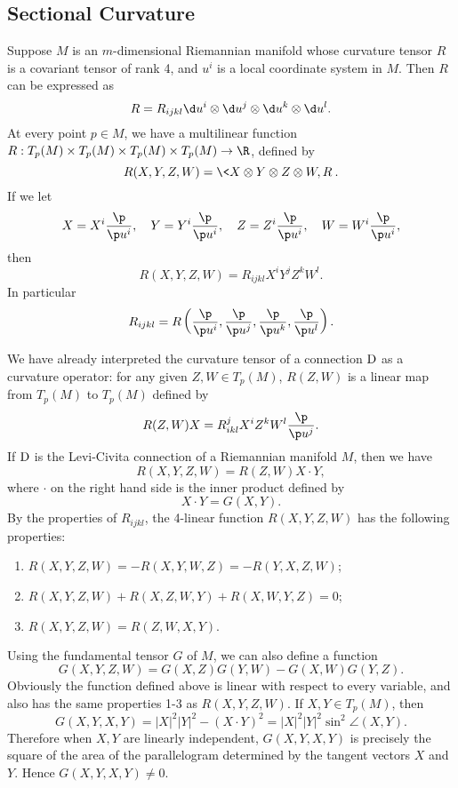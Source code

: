 \documentclass[11pt]{article}
\begin{document}
\subsection{Sectional Curvature}

Suppose $M$ is an $m$-dimensional Riemannian manifold whose curvature tensor $R$ is a covariant tensor of rank 4, and $u^i$ is a local coordinate system in $M$. Then $R$ can be expressed as $$R = R_{ijkl}\d u^i \otimes \d u^j \otimes \d u^k \otimes \d u^l.$$ At every point $p \in M$, we have a multilinear function $R : T_p(M) \times T_p(M) \times T_p(M) \times T_p(M) \rightarrow \R$, defined by $$R(X, Y, Z, W) = \<X \otimes Y \otimes Z \otimes W, R\>.$$ If we let $$X = X^i\frac{\p}{\p u^i}, \quad Y = Y^i\frac{\p}{\p u^i}, \quad Z = Z^i\frac{\p}{\p u^i}, \quad W = W^i\frac{\p}{\p u^i},$$ then $$R(X, Y, Z, W) = R_{ijkl}X^iY^jZ^kW^l.$$ In particular $$R_{ijkl} = R\left(\frac{\p}{\p u^i}, \frac{\p}{\p u^j}, \frac{\p}{\p u^k}, \frac{\p}{\p u^l}\right).$$

We have already interpreted the curvature tensor of a connection $\text{D}$ as a curvature operator: for any given $Z, W \in T_p(M)$, $R(Z, W)$ is a linear map from $T_p(M)$ to $T_p(M)$ defined by $$R(Z, W)X = R^j_{ikl}X^iZ^kW^l\frac{\p}{\p u^j}.$$ If $\text{D}$ is the Levi-Civita connection of a Riemannian manifold $M$, then we have $$R(X, Y, Z, W) = R(Z, W)X \cdot Y,$$ where $\cdot$ on the right hand side is the inner product defined by $$X \cdot Y = G(X, Y).$$ By the properties of $R_{ijkl}$, the 4-linear function $R(X, Y, Z, W)$ has the following properties:
\begin{enumerate}
    \item $R(X, Y, Z, W) = -R(X, Y, W, Z) = -R(Y, X, Z, W)$;
    \item $R(X, Y, Z, W) + R(X, Z, W, Y) + R(X, W, Y, Z) = 0$;
    \item $R(X, Y, Z, W) = R(Z, W, X, Y).$
\end{enumerate}

Using the fundamental tensor $G$ of $M$, we can also define a function $$G(X, Y, Z, W) = G(X, Z)G(Y, W) - G(X, W)G(Y, Z).$$ Obviously the function defined above is linear with respect to every variable, and also has the same properties 1-3 as $R(X, Y, Z, W)$. If $X, Y \in T_p(M)$, then $$G(X, Y, X, Y) = |X|^2|Y|^2 - (X \cdot Y)^2 = |X|^2|Y|^2\sin^2\angle(X, Y).$$ Therefore when $X, Y$ are linearly independent, $G(X, Y, X, Y)$ is precisely the square of the area of the parallelogram determined by the tangent vectors $X$ and $Y$. Hence $G(X, Y, X, Y) \neq 0$. 
\end{document}
